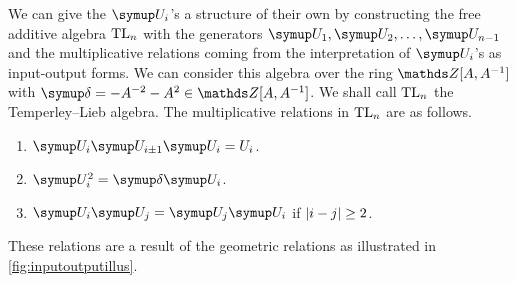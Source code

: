 We can give the \(\U_i\)'s a structure of their own by constructing the free additive algebra \(\text{TL}_n\) with the generators \(\U_1, \U_2,\ldots, \U_{n-1}\) and the multiplicative relations coming from the interpretation of \(\U_i\)'s as input-output forms. We can consider this algebra over the ring \(\Z[A, A^{-1}]\) with \(\updelta = -A^{-2} - A^2 \in \Z[A, A^{-1}]\). We shall call \(\text{TL}_n\) the Temperley--Lieb algebra. The multiplicative relations in \(\text{TL}_n\) are as follows.
\begin{enumerate}
	\item \(\U_i\U_{i\pm 1}\U_i = U_i\).
	\item \(\U_i^2 = \updelta \U_i\).
	\item \(\U_i\U_j = \U_j\U_i\) if \(\lvert i-j\rvert \geq 2\).
\end{enumerate}
These relations are a result of the geometric relations as illustrated in \cref{fig:inputoutputillus}.
